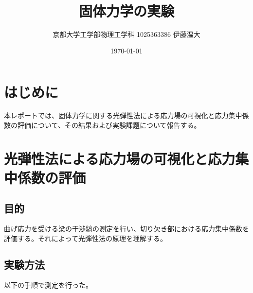 \documentclass[uplatex,dvipdfmx,titlepage]{jsarticle}
\title{固体力学の実験}
\author{京都大学工学部物理工学科 1025363386 伊藤温大}
\date{\today}
\begin{document}
\maketitle
\tableofcontents
\clearpage

\section{はじめに}
本レポートでは、固体力学に関する光弾性法による応力場の可視化と応力集中係数の評価について、その結果および実験課題について報告する。

\section{光弾性法による応力場の可視化と応力集中係数の評価}

\subsection{目的}
曲げ応力を受ける梁の干渉縞の測定を行い、切り欠き部における応力集中係数を評価する。それによって光弾性法の原理を理解する。

\subsection{実験方法}
以下の手順で測定を行った。
\end{document}
